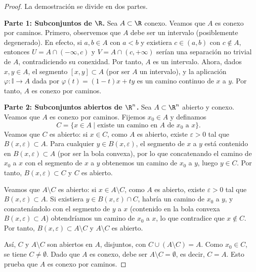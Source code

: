 \begin{proof}
    La demostración se divide en dos partes.

    \textbf{Parte 1: Subconjuntos de $\R$.} Sea $A \subset \R$ conexo. Veamos que $A$ es conexo por caminos. Primero, observemos que $A$ debe ser un intervalo (posiblemente degenerado). En efecto, si $a, b \in A$ con $a < b$ y existiera $c \in (a, b)$ con $c \notin A$, entonces $U = A \cap (-\infty, c)$ y $V = A \cap (c, +\infty)$ serían una separación no trivial de $A$, contradiciendo su conexidad. Por tanto, $A$ es un intervalo. Ahora, dados $x, y \in A$, el segmento $[x, y] \subset A$ (por ser $A$ un intervalo), y la aplicación $\varphi \colon \mathbb{I} \to A$ dada por $\varphi(t) = (1-t)x + ty$ es un camino continuo de $x$ a $y$. Por tanto, $A$ es conexo por caminos.

    \textbf{Parte 2: Subconjuntos abiertos de $\R^n$.} Sea $A \subset \R^n$ abierto y conexo. Veamos que $A$ es conexo por caminos. Fijemos $x_0 \in A$ y definamos
    $$C = \{x \in A \mid \text{existe un camino en } A \text{ de } x_0 \text{ a } x\}.$$
    Veamos que $C$ es abierto: si $x \in C$, como $A$ es abierto, existe $\varepsilon > 0$ tal que $B(x, \varepsilon) \subset A$. Para cualquier $y \in B(x, \varepsilon)$, el segmento de $x$ a $y$ está contenido en $B(x, \varepsilon) \subset A$ (por ser la bola convexa), por lo que concatenando el camino de $x_0$ a $x$ con el segmento de $x$ a $y$ obtenemos un camino de $x_0$ a $y$, luego $y \in C$. Por tanto, $B(x, \varepsilon) \subset C$ y $C$ es abierto.

    Veamos que $A \setminus C$ es abierto: si $x \in A \setminus C$, como $A$ es abierto, existe $\varepsilon > 0$ tal que $B(x, \varepsilon) \subset A$. Si existiera $y \in B(x, \varepsilon) \cap C$, habría un camino de $x_0$ a $y$, y concatenándolo con el segmento de $y$ a $x$ (contenido en la bola convexa $B(x, \varepsilon) \subset A$) obtendríamos un camino de $x_0$ a $x$, lo que contradice que $x \notin C$. Por tanto, $B(x, \varepsilon) \subset A \setminus C$ y $A \setminus C$ es abierto.

    Así, $C$ y $A \setminus C$ son abiertos en $A$, disjuntos, con $C \cup (A \setminus C) = A$. Como $x_0 \in C$, se tiene $C \neq \emptyset$. Dado que $A$ es conexo, debe ser $A \setminus C = \emptyset$, es decir, $C = A$. Esto prueba que $A$ es conexo por caminos.
\end{proof}

